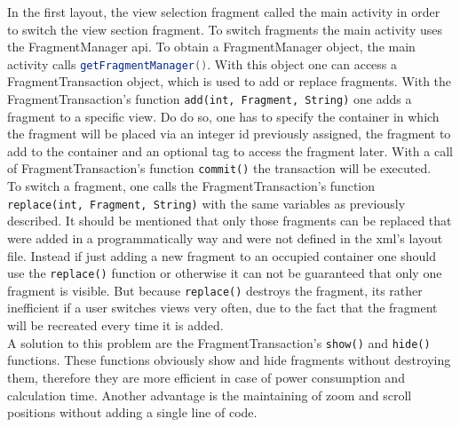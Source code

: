 In  the first layout, the view selection fragment called the main activity in order to switch the view section fragment. To switch fragments the main activity uses the FragmentManager api. To obtain a FragmentManager object, the main activity calls \lstinline[language=Java]$getFragmentManager()$. With this object one can access a FragmentTransaction object, which is used to add or replace fragments. With the FragmentTransaction's function \lstinline$add(int, Fragment, String)$ one adds a fragment to a specific view. Do do so, one has to specify the container in which the fragment will be placed via an integer id previously assigned, the fragment to add to the container and an optional tag to access the fragment later. With a call of FragmentTransaction's function \lstinline$commit()$ the transaction will be executed.\\
To switch a fragment, one calls the FragmentTransaction's function \lstinline$replace(int, Fragment, String)$ with the same variables as previously described. It should be mentioned that only those fragments can be replaced that were added in a programmatically way and were not defined in the xml's layout file. Instead if just adding a new fragment to an occupied container one should use the \lstinline$replace()$ function or otherwise it can not be guaranteed that only one fragment is visible. But because \lstinline$replace()$ destroys the fragment, its rather inefficient if a user switches views very often, due to the fact that the fragment will be recreated every time it is added.\\
A solution to this problem are the FragmentTransaction's \lstinline$show()$ and \lstinline$hide()$ functions. These functions obviously show and hide fragments without destroying them, therefore they are more efficient in case of power consumption and calculation time. Another advantage is the maintaining of zoom and scroll positions without adding a single line of code.

